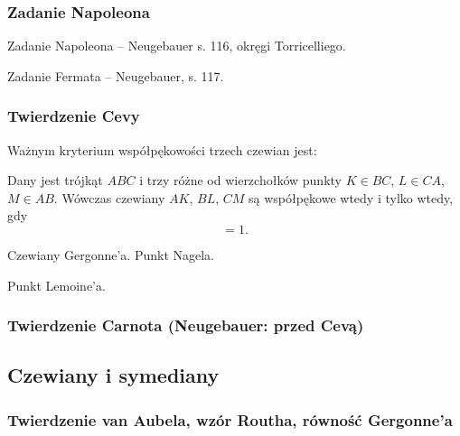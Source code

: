 \subsubsection{Zadanie Napoleona}

Zadanie Napoleona -- Neugebauer s. 116, okręgi Torricelliego.

Zadanie Fermata -- Neugebauer, s. 117.


\subsubsection{Twierdzenie Cevy}
Ważnym kryterium współpękowości trzech czewian jest:

\begin{proposition}
	Dany jest trójkąt $ABC$ i trzy różne od wierzchołków punkty $K \in BC$, $L \in CA$, $M \in AB$.
	Wówczas czewiany $AK$, $BL$, $CM$ są współpękowe wtedy i tylko wtedy, gdy
	\begin{equation}
		[AMB] [BKC] [CLA] = 1.
	\end{equation}
\end{proposition}

Czewiany Gergonne'a.
Punkt Nagela.

Punkt Lemoine'a.

\subsubsection{Twierdzenie Carnota (Neugebauer: przed Cevą)}


\subsection{Czewiany i symediany}
\subsubsection{Twierdzenie van Aubela, wzór Routha, równość Gergonne'a}
